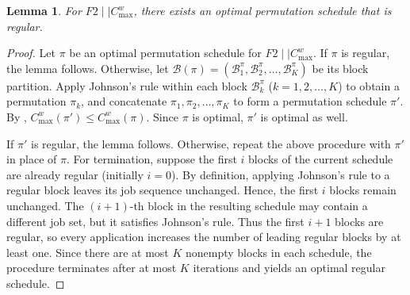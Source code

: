 \documentclass[12pt]{article}
\newtheorem{lemma}{Lemma}[section]
\renewcommand{\thefigure}{\arabic{figure}}
\begin{document}
\begin{sloppypar}
\begin{figure}[H]
        \end{figure} 
        
        \begin{lemma}\label{lem:regular-schedule}
            For $F2 \mid \mid C_{\max}^w$, there exists an optimal permutation schedule that is regular.
        \end{lemma}
        
        \begin{proof}
            Let $\pi$ be an optimal permutation schedule for $F2 \mid \mid C_{\max}^w$. If $\pi$ is regular, the lemma follows. Otherwise, let $\mathcal{B}(\pi)=(\mathcal{B}_1^{\pi}, \mathcal{B}_2^{\pi}, \ldots, \mathcal{B}_K^{\pi})$ be its block partition. Apply Johnson’s rule within each block $\mathcal{B}_k^{\pi}$ ($k=1, 2, \ldots, K$) to obtain a permutation $\pi_k$, and concatenate $\pi_1, \pi_2, \ldots, \pi_K$ to form a permutation schedule $\pi'$. By , $C_{\max}^w(\pi') \leq C_{\max}^w(\pi)$. Since $\pi$ is optimal, $\pi'$ is optimal as well. 
            
            If $\pi'$ is regular, the lemma follows. Otherwise, repeat the above procedure with $\pi'$ in place of $\pi$. For termination, suppose the first $i$ blocks of the current schedule are already regular (initially $i=0$). By definition, applying Johnson's rule to a regular block leaves its job sequence unchanged. Hence, the first $i$ blocks remain unchanged. The $(i+1)$-th block in the resulting schedule may contain a different job set, but it satisfies Johnson's rule. Thus the first $i+1$ blocks are regular, so every application increases the number of leading regular blocks by at least one. Since there are at most $K$ nonempty blocks in each schedule, the procedure terminates after at most $K$ iterations and yields an optimal regular schedule.
        \end{proof}
        

\end{sloppypar}
\end{document}
